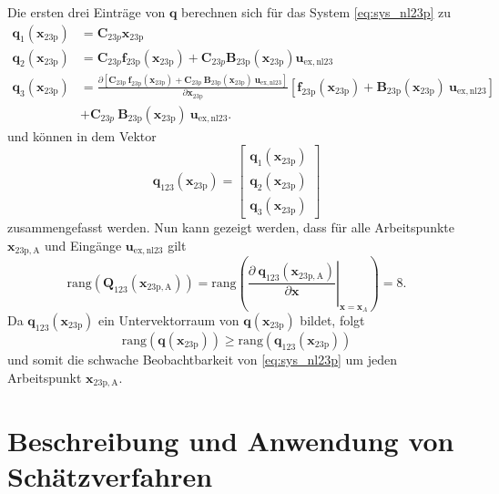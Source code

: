 Die ersten drei Einträge von $\pmb{q}$  berechnen sich für das System \eqref{eq:sys_nl23p} zu
\begin{align}
\pmb{q}_1(\pmb{x}_\mathrm{23p}) &= \pmb{C}_{23p}\pmb{x}_\mathrm{23p}\\
\pmb{q}_2(\pmb{x}_\mathrm{23p}) &= \pmb{C}_{23p}\pmb{f}_\mathrm{23p}(\pmb{x}_\mathrm{23p}) + \pmb{C}_{23p}\pmb{B}_\mathrm{23p}(\pmb{x}_\mathrm{23p})\pmb{u}_\mathrm{ex,nl23}\\ 
\pmb{q}_3(\pmb{x}_\mathrm{23p}) &= \frac{\partial \left[\pmb{C}_{23p}\:\pmb{f}_\mathrm{23p}(\pmb{x}_\mathrm{23p}) + \pmb{C}_{23p}\:\pmb{B}_\mathrm{23p}(\pmb{x}_\mathrm{23p})\:\pmb{u}_\mathrm{ex,nl23}\right]}{\partial \pmb{x}_\mathrm{23p}}\left[\pmb{f}_\mathrm{23p}(\pmb{x}_\mathrm{23p}) + \pmb{B}_\mathrm{23p}(\pmb{x}_\mathrm{23p})\:\pmb{u}_\mathrm{ex,nl23}\right]\\
&+ \pmb{C}_{23p}\:\pmb{B}_\mathrm{23p}(\pmb{x}_\mathrm{23p})\:\pmb{u}_\mathrm{ex,nl23}. \nonumber
\end{align}
und können in dem Vektor
\begin{equation}
\pmb{q}_{123}(\pmb{x}_\mathrm{23p}) = \begin{bmatrix} \pmb{q}_1(\pmb{x}_\mathrm{23p})\\\pmb{q}_2(\pmb{x}_\mathrm{23p})\\\pmb{q}_3(\pmb{x}_\mathrm{23p})
\end{bmatrix}
\end{equation}
zusammengefasst werden. Nun kann gezeigt werden, dass für alle Arbeitspunkte $\pmb{x}_\mathrm{23p,A}$ und Eingänge $\pmb{u}_\mathrm{ex,nl23}$ gilt 
\begin{equation}
\mathrm{rang}\left(\pmb{Q}_{123}(\pmb{x}_\mathrm{23p,A})\right) = \mathrm{rang}\left(\left.\frac{\partial\ \pmb{q}_{123}(\pmb{x}_\mathrm{23p,A})}{\partial \pmb{x}}\right|_{\pmb{x}=\pmb{x}_A}\right) = 8.
\end{equation}
Da $\pmb{q}_{123}(\pmb{x}_\mathrm{23p})$ ein Untervektorraum von $\pmb{q}(\pmb{x}_\mathrm{23p})$ bildet, folgt 
\begin{equation}
\mathrm{rang}\left(\pmb{q}(\pmb{x}_\mathrm{23p})\right) \geq \mathrm{rang}\left(\pmb{q}_{123}(\pmb{x}_\mathrm{23p})\right)
\end{equation}
und somit die schwache Beobachtbarkeit von \eqref{eq:sys_nl23p} um jeden Arbeitspunkt $\pmb{x}_\mathrm{23p,A}$.

\section{Beschreibung und Anwendung von Schätzverfahren}

